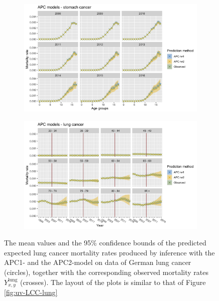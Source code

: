 \begin{figure}[h!]
    \centering
    \begin{subfigure}[b]{.75\linewidth}
        \includegraphics[width=\linewidth]{real-data/real-data-univariate/Figures/univariate-APC-by-age-lung.png}
        \label{fig:uv-APC-lung}
    \end{subfigure}
    
    \begin{subfigure}[b]{.75\linewidth}
        \includegraphics[width=\linewidth]{real-data/real-data-univariate/Figures/univariate-APC-by-period-lung.png}
        \label{fig:uv-APC-lung-bottom}
    \end{subfigure}
    \caption{The mean values and the 95\% confidence bounds of the predicted expected lung cancer mortality rates produced by inference with the APC1- and the APC2-model on data of German lung cancer (circles), together with the corresponding observed mortality rates $Y_{x,y}^{\text{lung}}$ (crosses). The layout of the plots is similar to that of Figure \ref{fig:uv-LCC-lung}}
    \label{fig:uv-APC-lung}
\end{figure}

